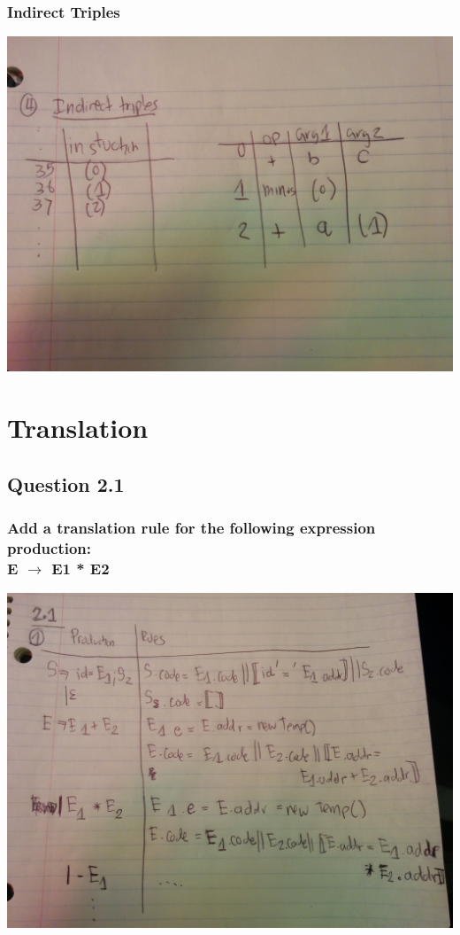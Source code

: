 \documentclass[11pt, oneside]{article}   	%
\begin{document}
\subsubsection{Indirect Triples}
\includegraphics[scale=0.15]{IMG_20141029_001005.jpg}

\newpage

\section{Translation}

\subsection{Question 2.1}

\subsubsection{Add a translation rule for the following expression production: \\ E $\rightarrow$ E1 * E2}
\includegraphics[scale=0.15]{IMG_20141029_003207.jpg}
\end{document}
